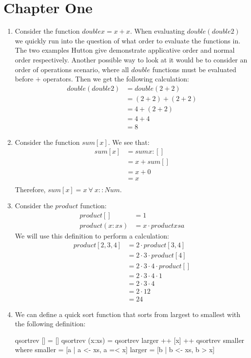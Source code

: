 \documentclass{article}
\begin{document}
\section{Chapter One}
\begin{enumerate}
\item Consider the function $double x = x + x$. When evaluating $double ( double 2)$ we quickly run into the question of what order to evaluate the functions in. The two examples Hutton give demonstrate applicative order and normal order respectively. Another possible way to look at it would be to consider an order of operations scenario, where all $double$ functions must be evaluated before $+$ operators. Then we get the following calculation:
\begin{align*}
double ( double 2) &= double ( 2 + 2)\\
&= (2 +2 ) +(2+2)\\
&=4 + (2 + 2)\\
&= 4 + 4\\
&= 8
\end{align*}

\item Consider the function $sum [x]$. We see that:
\begin{align*}
sum[x] &= sum x:[]\\
&= x + sum[]\\
&= x + 0\\
&= x\\
\end{align*}
Therefore, $sum [x] = x \ \forall \ x :: Num$.

\item Consider the $product$ function:
\begin{align*}
product [] &= 1\\
product (x:xs) &= x \cdot product xsa
\end{align*}
We will use this definition to perform a calculation:
\begin{align*}
product [2,3,4] &= 2 \cdot product [3,4]\\
&= 2 \cdot 3 \cdot product [4]\\
&= 2 \cdot 3 \cdot 4 \cdot product []\\
&= 2 \cdot 3 \cdot 4 \cdot 1\\
&= 2 \cdot 3 \cdot 4 \\
&= 2 \cdot 12\\
&= 24
\end{align*}

\item We can define a quick sort function that sorts from largest to smallest with the following definition:
\begin{code}
    qsortrev [] = []
qsortrev (x:xs) = qsortrev  larger ++ [x] ++ qsortrev  smaller
                          where 
                             smaller = [a | a <- xs, a =< x]
                             larger = [b | b <- xs, b > x] 
\end{code}


\end{enumerate}
\end{document}
